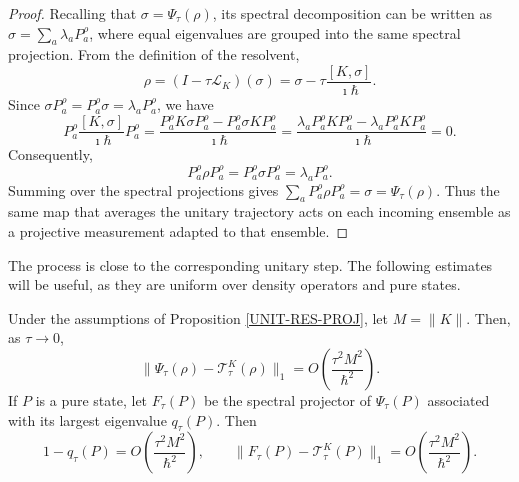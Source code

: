 \documentclass{techbrief}
\begin{document}
\begin{proof}
	Recalling that $\sigma=\Psi_\tau(\rho)$, its spectral decomposition can be written as $\sigma=\sum_a\lambda_aP_a^\rho$, where equal eigenvalues are grouped into the same spectral projection. From the definition of the resolvent,
	\begin{equation}
		\rho=(I-\tau\mathcal{L}_K)(\sigma)=\sigma-\tau\frac{[K,\sigma]}{\imath\hbar}.
	\end{equation}
	Since $\sigma P_a^\rho=P_a^\rho\sigma=\lambda_aP_a^\rho$, we have
	\begin{equation}
		P_a^\rho\frac{[K,\sigma]}{\imath\hbar}P_a^\rho= \frac{P_a^\rho K \sigma P_a^\rho - P_a^\rho \sigma K P_a^\rho}{\imath\hbar}=\frac{\lambda_a P_a^\rho K P_a^\rho - \lambda_a P_a^\rho K P_a^\rho}{\imath\hbar} =0.
	\end{equation}
	Consequently,
	\begin{equation}
		P_a^\rho\rho P_a^\rho=P_a^\rho\sigma P_a^\rho=\lambda_aP_a^\rho.
	\end{equation}
	Summing over the spectral projections gives $\sum_aP_a^\rho\rho P_a^\rho=\sigma=\Psi_\tau(\rho)$. Thus the same map that averages the unitary trajectory acts on each incoming ensemble as a projective measurement adapted to that ensemble.
\end{proof}

The process is close to the corresponding unitary step. The following estimates will be useful, as they are uniform over density operators and pure states.

\begin{prop}\label{INF-PRED}
	Under the assumptions of Proposition \ref{UNIT-RES-PROJ}, let $M=\|K\|$. Then, as $\tau\to0$,
	\begin{equation}
		\|\Psi_\tau(\rho)-\mathcal{T}_\tau^K(\rho)\|_1=O\left(\frac{\tau^2M^2}{\hbar^2}\right).
	\end{equation}
	If $P$ is a pure state, let $F_\tau(P)$ be the spectral projector of $\Psi_\tau(P)$ associated with its largest eigenvalue $q_\tau(P)$. Then
	\begin{equation}
		1-q_\tau(P)=O\left(\frac{\tau^2M^2}{\hbar^2}\right),
		\qquad
		\|F_\tau(P)-\mathcal{T}_\tau^K(P)\|_1=O\left(\frac{\tau^2M^2}{\hbar^2}\right).
	\end{equation}
\end{prop}
\end{document}
